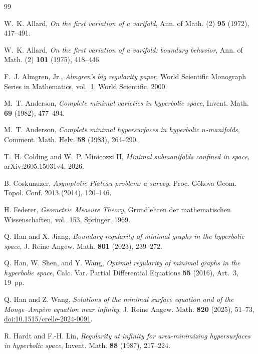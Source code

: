 \documentclass[11pt,reqno]{amsart}
\numberwithin{equation}{section}
\theoremstyle{definition}
\theoremstyle{remark}
\begin{document}
\begin{thebibliography}{99}

W.~K. Allard,
\emph{On the first variation of a varifold},
Ann. of Math. (2) \textbf{95} (1972), 417--491.

W.~K. Allard,
\emph{On the first variation of a varifold: boundary behavior},
Ann. of Math. (2) \textbf{101} (1975), 418--446.

F.~J. Almgren, Jr.,
\emph{Almgren's big regularity paper},
World Scientific Monograph Series in Mathematics, vol.~1,
World Scientific, 2000.

M.~T. Anderson,
\emph{Complete minimal varieties in hyperbolic space},
Invent. Math. \textbf{69} (1982), 477--494.

M.~T. Anderson,
\emph{Complete minimal hypersurfaces in hyperbolic $n$-manifolds},
Comment. Math. Helv. \textbf{58} (1983), 264--290.

T.~H. Colding and W.~P. Minicozzi II,
\emph{Minimal submanifolds confined in space},
arXiv:2605.15031v4, 2026.

B. Coskunuzer,
\emph{Asymptotic Plateau problem: a survey},
Proc. G\"okova Geom. Topol. Conf. 2013 (2014), 120--146.

H. Federer,
\emph{Geometric Measure Theory},
Grundlehren der mathematischen Wissenschaften, vol.~153,
Springer, 1969.

Q. Han and X. Jiang,
\emph{Boundary regularity of minimal graphs in the hyperbolic space},
J. Reine Angew. Math. \textbf{801} (2023), 239--272.

Q. Han, W. Shen, and Y. Wang,
\emph{Optimal regularity of minimal graphs in the hyperbolic space},
Calc. Var. Partial Differential Equations \textbf{55} (2016), Art.~3,
19~pp.

Q. Han and Z. Wang,
\emph{Solutions of the minimal surface equation and of the Monge--Amp\`ere
equation near infinity},
J. Reine Angew. Math. \textbf{820} (2025), 51--73,
\href{https://doi.org/10.1515/crelle-2024-0091}
{doi:10.1515/crelle-2024-0091}.

R. Hardt and F.-H. Lin,
\emph{Regularity at infinity for area-minimizing hypersurfaces in hyperbolic
space},
Invent. Math. \textbf{88} (1987), 217--224.



\end{thebibliography}
\end{document}
